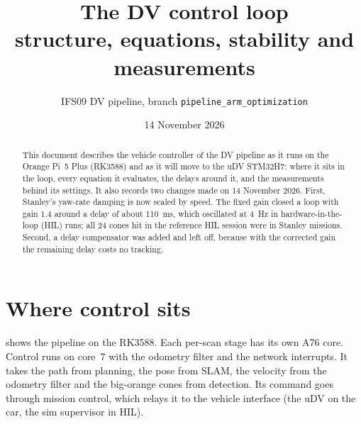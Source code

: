 \documentclass[11pt,a4paper]{article}
\title{The DV control loop\\[2pt]\large structure, equations, stability and measurements}
\author{IFS09 DV pipeline, branch \texttt{pipeline\_arm\_optimization}}
\date{14 November 2026}
\begin{document}
\maketitle

\begin{abstract}
This document describes the vehicle controller of the DV pipeline as it runs on the
Orange Pi~5 Plus (RK3588) and as it will move to the uDV STM32H7: where it sits in the
loop, every equation it evaluates, the delays around it, and the measurements behind its
settings. It also records two changes made on 14 November 2026. First, Stanley's
yaw-rate damping is now scaled by speed. The fixed gain closed a loop with gain
$1.4$ around a delay of about \SI{110}{\milli\second}, which oscillated at
\SI{4}{\hertz} in hardware-in-the-loop (HIL) runs; all 24 cones hit in the reference HIL
session were in Stanley missions. Second, a delay compensator was added and left off,
because with the corrected gain the remaining delay costs no tracking.
\end{abstract}

\tableofcontents
\newpage

\section{Where control sits}

 shows the pipeline on the RK3588. Each per-scan stage has its own A76
core. Control runs on core~7 with the odometry filter and the network interrupts. It
takes the path from planning, the pose from SLAM, the velocity from the odometry filter
and the big-orange cones from detection. Its command goes through mission control, which
relays it to the vehicle interface (the uDV on the car, the sim supervisor in HIL).
\end{document}
